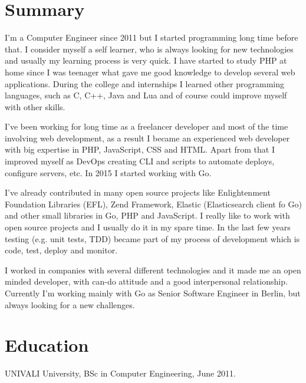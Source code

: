 \documentclass[margin]{res}
\begin{document}
\address{Berlin, DE \\ xguiga@gmail.com \\ Phone: +49 (173) 979-9383 }

\begin{resume}

\section{Summary}
I'm a Computer Engineer since 2011 but I started programming long time before that. I consider myself a self learner, who is always looking for new technologies and usually my learning process is very quick. I have started to study PHP at home since I was teenager what gave me good knowledge to develop several web applications. During the college and internships I learned other programming languages, such as C, C++, Java and Lua and of course could improve myself with other skills.

I've been working for long time as a freelancer developer and most of the time involving web development, as a result I became an experienced web developer with big expertise in PHP, JavaScript, CSS and HTML. Apart from that I improved myself as DevOps creating CLI and scripts to automate deploys, configure servers, etc. In 2015 I started working with Go.

I've already contributed in many open source projects like Enlightenment Foundation Libraries (EFL), Zend Framework, Elastic (Elasticsearch client fo Go) and other small libraries in Go, PHP and JavaScript. I really like to work with open source projects and I usually do it in my spare time. In the last few years testing (e.g. unit tests, TDD) became part of my process of development which is code, test, deploy and monitor.

I worked in companies with several different technologies and it made me an open minded developer, with can-do attitude and a good interpersonal relationship. Currently I'm working mainly with Go as Senior Software Engineer in Berlin, but always looking for a new challenges.

\section{Education} UNIVALI University, BSc in Computer Engineering, June 2011.


\end{resume}
\end{document}
